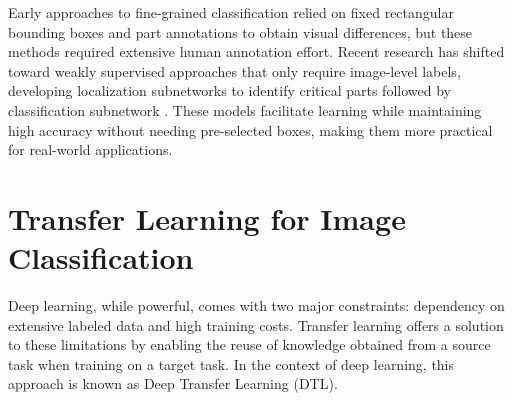 \documentclass[a4paper,12pt]{report}
\begin{document}
Early approaches to fine-grained classification relied on fixed rectangular bounding boxes and part annotations to obtain visual differences, but these methods required extensive human annotation effort. Recent research has shifted toward weakly supervised approaches that only require image-level labels, developing localization subnetworks to identify critical parts followed by classification subnetwork \citep{source2}. These models facilitate learning while maintaining high accuracy without needing pre-selected boxes, making them more practical for real-world applications.





\section*{Transfer Learning for Image Classification}
Deep learning, while powerful, comes with two major constraints: dependency on extensive labeled data and high training costs\citep{iman2022review}. Transfer learning offers a solution to these limitations by enabling the reuse of knowledge obtained from a source task when training on a target task. In the context of deep learning, this approach is known as Deep Transfer Learning (DTL)\citep{iman2022review}.
\end{document}
